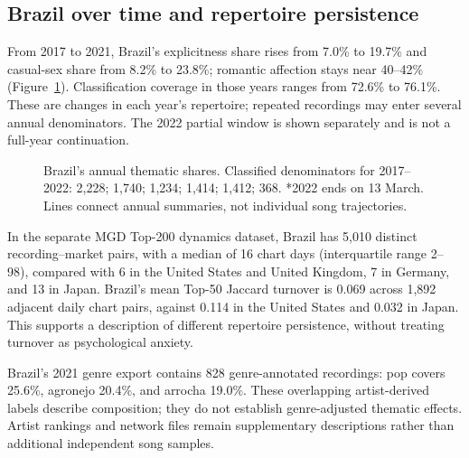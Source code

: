 \documentclass[10pt,a4paper,twocolumn]{article}
\begin{document}
\subsection{Brazil over time and repertoire persistence}
From 2017 to 2021, Brazil's explicitness share rises from 7.0\% to 19.7\% and casual-sex share from 8.2\% to 23.8\%; romantic affection stays near 40--42\% (Figure~\ref{fig:brazil}). Classification coverage in those years ranges from 72.6\% to 76.1\%. These are changes in each year's repertoire; repeated recordings may enter several annual denominators. The 2022 partial window is shown separately and is not a full-year continuation.

\begin{figure}[t]
\centering
{}
\caption{Brazil's annual thematic shares. Classified denominators for 2017--2022: 2,228; 1,740; 1,234; 1,414; 1,412; 368. *2022 ends on 13 March. Lines connect annual summaries, not individual song trajectories.}
\label{fig:brazil}
\end{figure}

In the separate MGD Top-200 dynamics dataset, Brazil has 5,010 distinct recording--market pairs, with a median of 16 chart days (interquartile range 2--98), compared with 6 in the United States and United Kingdom, 7 in Germany, and 13 in Japan. Brazil's mean Top-50 Jaccard turnover is 0.069 across 1,892 adjacent daily chart pairs, against 0.114 in the United States and 0.032 in Japan. This supports a description of different repertoire persistence, without treating turnover as psychological anxiety.

Brazil's 2021 genre export contains 828 genre-annotated recordings: pop covers 25.6\%, agronejo 20.4\%, and arrocha 19.0\%. These overlapping artist-derived labels describe composition; they do not establish genre-adjusted thematic effects. Artist rankings and network files remain supplementary descriptions rather than additional independent song samples.
\end{document}
